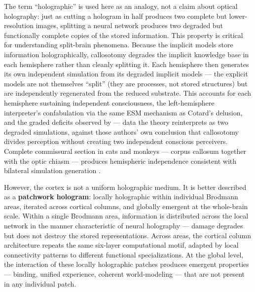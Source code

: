\documentclass[12pt]{article}
\newcommand{\revstart}{}
\newcommand{\revend}{}
\begin{document}
The term ``holographic'' is used here as an analogy, not a claim about optical holography: just as cutting a hologram in half produces two complete but lower-resolution images, splitting a neural network produces two degraded but functionally complete copies of the stored information. This property is critical for understanding split-brain phenomena. {\revstart Because the implicit models store information holographically, callosotomy degrades the implicit knowledge base in each hemisphere rather than cleanly splitting it. Each hemisphere then generates its own independent simulation from its degraded implicit models --- the explicit models are not themselves ``split'' (they are processes, not stored structures) but are independently regenerated from the reduced substrate. This accounts for each hemisphere sustaining independent consciousness, the left-hemisphere interpreter's confabulation \citep{Gazzaniga2000} via the same ESM mechanism as Cotard's delusion, and the graded deficits observed by \citet{Pinto2017} --- data the theory reinterprets as two degraded simulations, against those authors' own conclusion that callosotomy divides perception without creating two independent conscious perceivers. Complete commissural section in cats and monkeys --- corpus callosum together with the optic chiasm --- produces hemispheric independence consistent with bilateral simulation generation \citep{MyersSperry1958,Trevarthen1962}.\revend}

However, the cortex is not a uniform holographic medium. It is better described as a \textbf{patchwork hologram}: locally holographic within individual Brodmann areas, iterated across cortical columns, and globally emergent at the whole-brain scale. Within a single Brodmann area, information is distributed across the local network in the manner characteristic of neural holography --- damage degrades but does not destroy the stored representations. Across areas, the cortical column architecture repeats the same six-layer computational motif, adapted by local connectivity patterns to different functional specializations. At the global level, the interaction of these locally holographic patches produces emergent properties --- binding, unified experience, coherent world-modeling --- that are not present in any individual patch.
\end{document}
